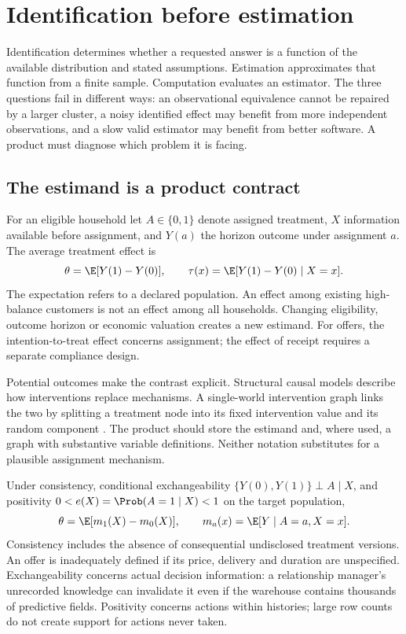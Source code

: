 \chapter{Identification before estimation}\label{ch:identification}
Identification determines whether a requested answer is a function of the
available distribution and stated assumptions. Estimation approximates that
function from a finite sample. Computation evaluates an estimator. The three
questions fail in different ways: an observational equivalence cannot be
repaired by a larger cluster, a noisy identified effect may benefit from more
independent observations, and a slow valid estimator may benefit from better
software. A product must diagnose which problem it is facing.
\section{The estimand is a product contract}
For an eligible household let $A\in\{0,1\}$ denote assigned treatment, $X$
information available before assignment, and $Y(a)$ the horizon outcome under
assignment $a$. The average treatment effect is
\begin{equation}
 \theta=\E[Y(1)-Y(0)],\qquad
 \tau(x)=\E[Y(1)-Y(0)\mid X=x].
 \label{eq:ate}
\end{equation}
The expectation refers to a declared population. An effect among existing
high-balance customers is not an effect among all households. Changing
eligibility, outcome horizon or economic valuation creates a new
estimand. For offers, the intention-to-treat effect concerns assignment;
the effect of receipt requires a separate compliance design.

Potential outcomes make the contrast explicit. Structural causal models
describe how interventions replace mechanisms. A single-world intervention
graph links the two by splitting a treatment node into its fixed intervention
value and its random component \citep{hernan2020,peters2017,swig2013}.
The product should store the estimand and, where used, a graph with
substantive variable definitions. Neither notation substitutes for a plausible
assignment mechanism.

Under consistency, conditional exchangeability
$\{Y(0),Y(1)\}\perp A\mid X$, and positivity
$0<e(X)=\Prob(A=1\mid X)<1$ on the target population,
\begin{equation}
 \theta=\E[m_1(X)-m_0(X)],\qquad m_a(x)=\E[Y\mid A=a,X=x].
 \label{eq:adjust}
\end{equation}
Consistency includes the absence of consequential undisclosed treatment
versions. An offer is inadequately defined if its price, delivery and duration
are unspecified. Exchangeability concerns actual decision information:
a relationship manager's unrecorded knowledge can invalidate it even if the
warehouse contains thousands of predictive fields. Positivity concerns actions
within histories; large row counts do not create support for actions never taken.

